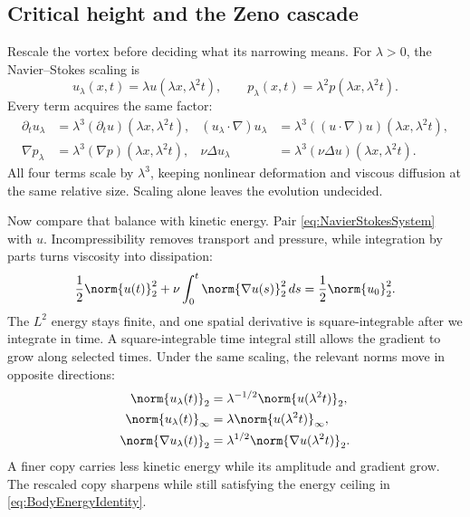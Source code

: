 \subsection{Critical height and the Zeno cascade}\label{sub:CriticalHeightAndTheZenoCascade}

Rescale the vortex before deciding what its narrowing means. For \(\lambda>0\), the Navier--Stokes scaling is
\begin{equation}\label{eq:BodyNavierStokesScaling}
  u_\lambda(x,t)=\lambda u(\lambda x,\lambda^2t),
  \qquad
  p_\lambda(x,t)=\lambda^2p(\lambda x,\lambda^2t).
\end{equation}
Every term acquires the same factor:
\begin{equation}\label{eq:BodyBalancedEquationScaling}
\begin{aligned}
  \partial_tu_\lambda
    &=\lambda^3(\partial_tu)(\lambda x,\lambda^2t),
  &
  (u_\lambda\cdot\nabla)u_\lambda
    &=\lambda^3((u\cdot\nabla)u)(\lambda x,\lambda^2t),
  \\
  \nabla p_\lambda
    &=\lambda^3(\nabla p)(\lambda x,\lambda^2t),
  &
  \nu\Delta u_\lambda
    &=\lambda^3(\nu\Delta u)(\lambda x,\lambda^2t).
\end{aligned}
\end{equation}
All four terms scale by \(\lambda^3\), keeping nonlinear deformation and viscous diffusion at the same relative size.
Scaling alone leaves the evolution undecided.

Now compare that balance with kinetic energy.
Pair \eqref{eq:NavierStokesSystem} with \(u\).
Incompressibility removes transport and pressure, while integration by parts turns viscosity into dissipation:
\begin{equation}\label{eq:BodyEnergyIdentity}
  \frac12\norm{u(t)}_2^2
  +\nu\int_0^t\norm{\nabla u(s)}_2^2\,ds
  =\frac12\norm{u_0}_2^2.
\end{equation}
The \(L^2\) energy stays finite, and one spatial derivative is square-integrable after we integrate in time.
A square-integrable time integral still allows the gradient to grow along selected times.
Under the same scaling, the relevant norms move in opposite directions:
\begin{equation}\label{eq:BodyScalingNormComparison}
  \begin{aligned}
    \norm{u_\lambda(t)}_2
      &=\lambda^{-1/2}\norm{u(\lambda^2t)}_2,\\
    \norm{u_\lambda(t)}_\infty
      &=\lambda\norm{u(\lambda^2t)}_\infty,\\
    \norm{\nabla u_\lambda(t)}_2
      &=\lambda^{1/2}\norm{\nabla u(\lambda^2t)}_2.
  \end{aligned}
\end{equation}
A finer copy carries less kinetic energy while its amplitude and gradient grow.
The rescaled copy sharpens while still satisfying the energy ceiling in \eqref{eq:BodyEnergyIdentity}.

